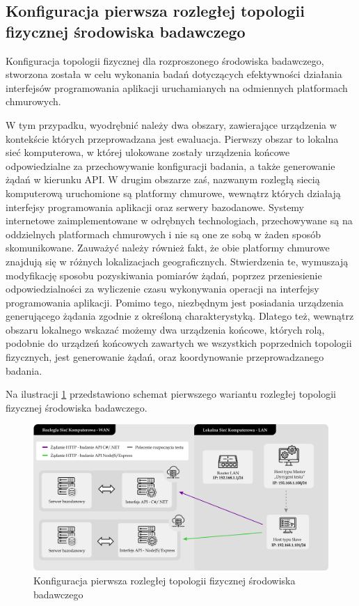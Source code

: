 \subsection*{Konfiguracja pierwsza rozległej topologii fizycznej środowiska badawczego}
\label{sec:rozproszone-srodowisko-badawcze-ver-1}
Konfiguracja topologii fizycznej dla rozproszonego środowiska badawczego, stworzona została w celu wykonania badań dotyczących efektywności działania interfejsów programowania aplikacji uruchamianych na odmiennych platformach chmurowych.

W tym przypadku, wyodrębnić należy dwa obszary, zawierające urządzenia w kontekście których przeprowadzana jest ewaluacja. Pierwszy obszar to lokalna sieć komputerowa, w której ulokowane zostały urządzenia końcowe odpowiedzialne za przechowywanie konfiguracji badania, a także generowanie żądań w kierunku API. W drugim obszarze zaś, nazwanym rozległą siecią komputerową uruchomione są platformy chmurowe, wewnątrz których działają interfejsy programowania aplikacji oraz serwery bazodanowe. Systemy internetowe zaimplementowane w odrębnych technologiach, przechowywane są na oddzielnych platformach chmurowych i nie są one ze sobą w żaden sposób skomunikowane. Zauważyć należy również fakt, że obie platformy chmurowe znajdują się w różnych lokalizacjach geograficznych. Stwierdzenia te, wymuszają modyfikację sposobu pozyskiwania pomiarów żądań, poprzez przeniesienie odpowiedzialności za wyliczenie czasu wykonywania operacji na interfejsy programowania aplikacji. Pomimo tego, niezbędnym jest posiadania urządzenia generującego żądania zgodnie z określoną charakterystyką. Dlatego też, wewnątrz obszaru lokalnego wskazać możemy dwa urządzenia końcowe, których rolą, podobnie do urządzeń końcowych zawartych we wszystkich poprzednich topologii fizycznych, jest generowanie żądań, oraz koordynowanie przeprowadzanego badania.

Na ilustracji \ref{fig:topologia-4} przedstawiono schemat pierwszego wariantu rozległej topologii fizycznej środowiska badawczego.

\clearpage

\begin{figure}[ht]
    \centering
     \includegraphics[width=\linewidth]{rys04/topologia-4.png}
    \caption{Konfiguracja pierwsza rozległej topologii fizycznej środowiska badawczego}
    \label{fig:topologia-4}
\end{figure}

